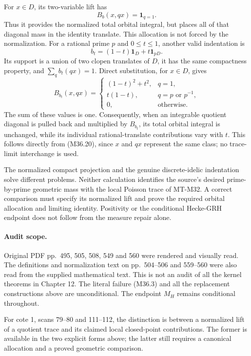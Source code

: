 For $x\in D$, its two-variable lift has
\[
                   B_b(x,qx)=\mathbf1_{q=1}.
 \tag{M36.18}
\]
Thus it provides the normalized total orbital integral,
but places all of that diagonal mass in the identity
translate.  This allocation is not forced by the
normalization.  For a rational prime $p$ and
$0\le t\le1$, another valid indentation is
\[
                    b_t=(1-t)\mathbf1_D+t\mathbf1_{pD}.
 \tag{M36.19}
\]
Its support is a union of two clopen translates of
$D$, it has the same compactness property, and
$\sum_qb_t(qx)=1$.  Direct substitution, for $x\in D$,
gives
\[
 B_{b_t}(x,qx)=
 \begin{cases}
       (1-t)^2+t^2,&q=1,\\
       t(1-t),&q=p\text{ or }p^{-1},\\
       0,&\text{otherwise}.
 \end{cases}
 \tag{M36.20}
\]
The sum of these values is one.  Consequently, when
an integrable quotient diagonal is pulled back and
multiplied by $B_{b_t}$, its total orbital integral is
unchanged, while its individual rational-translate
contributions vary with $t$.  This follows directly
from (M36.20), since $x$ and $qx$ represent the same
class; no trace-limit interchange is used.

The normalized compact projection and the genuine
discrete-idelic indentation solve different problems.
Neither calculation identifies the source's desired
prime-by-prime geometric mass with the local Poisson
trace of MT-M32.  A correct comparison must specify
its normalized lift and prove the required orbital
allocation and limiting identity.  Positivity or the
conditional Hecke-GRH endpoint does not follow from
the measure repair alone.

\paragraph{Audit scope.}
Original PDF pp.~495, 505, 508, 549 and 560 were
rendered and visually read.  The definitions and
normalization text on pp.~504--506 and 559--560 were
also read from the supplied mathematical text.
This is not an audit of all the kernel theorems in
Chapter 12.  The literal failure (M36.3) and all the
replacement constructions above are unconditional.
The endpoint $M_H$ remains conditional throughout.

For cote 1, scans 79--80 and 111--112, the distinction
is between a normalized lift of a quotient trace and
its claimed local closed-point contributions.  The
former is available in the two explicit forms above;
the latter still requires a canonical allocation and
a proved geometric comparison.

